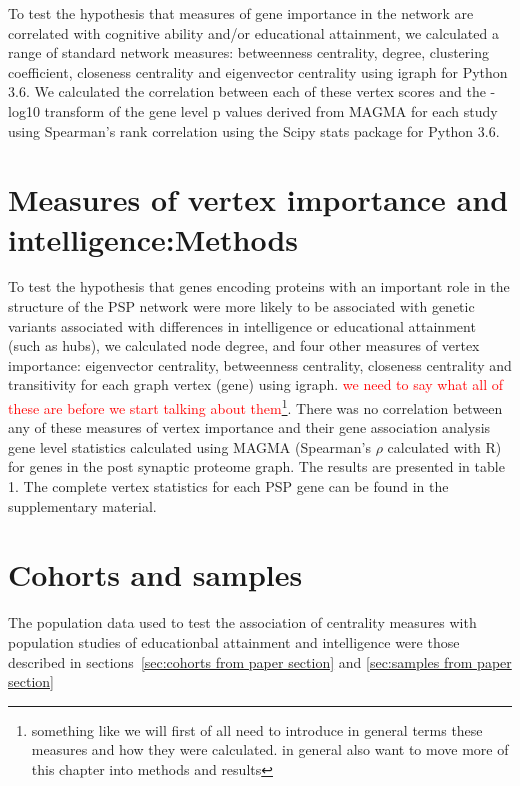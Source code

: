 To test the hypothesis that measures of gene importance in the network are correlated with cognitive ability and/or educational attainment, we calculated a range of standard network measures: betweenness centrality, degree, clustering coefficient, closeness centrality and eigenvector centrality using igraph for Python 3.6. \cite{csardi2006igraph}  We calculated the correlation between each of these vertex scores and the -log10 transform of the gene level p values derived from MAGMA for each study using Spearman’s rank correlation using the Scipy stats package for Python 3.6. \section{Measures of vertex importance and intelligence:Methods}

\label{sec:Measurs of vertex importance from paper}
To test the hypothesis that genes encoding proteins with an important role in the structure of the PSP network were more likely to be associated with genetic variants associated with differences in intelligence or educational attainment (such as hubs), we calculated node degree, and four other measures of vertex importance: eigenvector centrality, betweenness centrality, closeness centrality and transitivity for each graph vertex (gene) using igraph. \cite{csardi2006igraph} \textcolor{red}{we need to say what all of these are before we start talking about them}\footnote{something like we will first of all need to introduce in general terms these measures and how they were calculated. in general also want to move more of this chapter into methods and results}. There was no correlation between any of these measures of vertex importance and their gene association analysis gene level statistics calculated using MAGMA (Spearman’s $\rho$ calculated with R) for genes in the post synaptic proteome graph. The results are presented in table 1. The complete vertex statistics for each PSP gene can be found in the supplementary material. 

\section{Cohorts and samples}
\label{Centrality:cohorts and samples}
The population data used to test the association of centrality measures with population studies of educationbal attainment and intelligence were those described in sections~\ref{sec:cohorts from paper section} and \ref{sec:samples from paper section}

